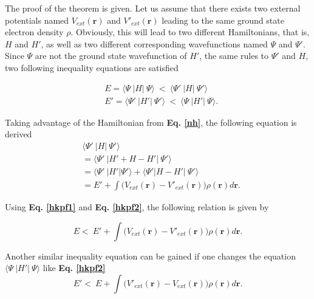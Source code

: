 \documentclass[a4paper, 12pt, titlepage,oneside,drop]{kthesis}
\begin{document}
The proof of the theorem is given. Let us assume that there exists two external potentials named $V_{ext}(\textbf{r})$ and $V'_{ext}(\textbf{r})$ leading to the same ground state 
electron density $\rho$. Obviously, this will lead to two different Hamiltonians, that is, ${H}$ and ${H'}$, as well as two different corresponding
wavefunctions named $\Psi$ and $\Psi'$. Since $\Psi$ are not the ground state wavefunction of ${H'}$, the same rules to $\Psi'$ and ${H}$, two following
inequality equations are satisfied

\begin{equation}\label{hkpf1}\begin{split}
&  E = \langle \Psi\ |{H}|\ \Psi \rangle  \ < \  \langle \Psi'\ |{H}|\ \Psi' \rangle \\
&  E' = \langle \Psi'\ |{H'}|\ \Psi' \rangle  \ < \  \langle \Psi\ |{H'}|\ \Psi \rangle.
\end{split}\end{equation}

Taking advantage of the Hamiltonian from \textbf{Eq. \ref{nh}}, the following equation is derived
\begin{equation}\label{hkpf2}\begin{split}
&    \langle \Psi'\ |{H}|\ \Psi' \rangle \\
&  = \langle \Psi'\ |{H'} + {H} - {H'}|\ \Psi' \rangle \\
&  = \langle \Psi'\ |{H'} |\Psi' \rangle + \langle \Psi' | {H} - {H'}|\ \Psi' \rangle \\
&  = E' + \int \Big( V_{ext}(\textbf{r}) - V'_{ext}(\textbf{r}) \Big)  \rho(\textbf{r}) d \textbf{r}.
\end{split}\end{equation}

Using \textbf{Eq. \ref{hkpf1}} and \textbf{Eq. \ref{hkpf2}}, the following relation is given by

\begin{equation}\label{hkpf3}
 E  < \  E' + \int \Big( V_{ext}(\textbf{r}) - V'_{ext}(\textbf{r}) \Big)  \rho(\textbf{r}) d \textbf{r} .
\end{equation}

Another similar inequality equation can be gained if one changes the equation $\langle \Psi\ |{H'}|\ \Psi \rangle$ like \textbf{Eq. \ref{hkpf2}}
\begin{equation}\label{hkpf44}
  E'  < \  E + \int \Big( V'_{ext}(\textbf{r}) - V_{ext}(\textbf{r}) \Big)  \rho(\textbf{r}) d \textbf{r} .
\end{equation}
\end{document}
